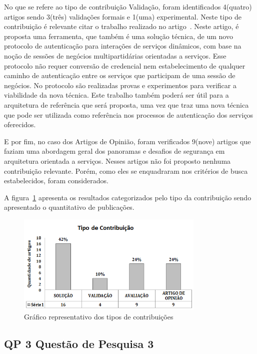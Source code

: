 No que se refere ao tipo de contribuição Validação, foram identificados 4(quatro) artigos  sendo 3(três) validações formais e 1(uma) experimental. Neste tipo de contribuição é relevante citar o trabalho realizado no artigo~\cite{ CrossRealmSOA2012}. Neste artigo, é proposta uma ferramenta, que também é uma solução técnica, de um novo protocolo de autenticação para interações de serviços dinâmicos, com base na noção de sessões de negócios multipartidárias orientadas a serviços. Esse protocolo não requer conversão de credencial nem estabelecimento de qualquer caminho de autenticação entre os serviços que participam de uma sessão de negócios. No protocolo são realizadas provas e experimentos para verificar a viabilidade da nova técnica. Este trabalho também poderá ser útil para a arquitetura de referência que será proposta, uma vez que traz uma nova técnica que pode ser utilizada como referência nos processos de autenticação dos serviços oferecidos.

E por fim, no caso dos Artigos de Opinião, foram verificados 9(nove) artigos que faziam uma abordagem geral dos panoramas e desafios de segurança em arquitetura orientada a serviços. Nesses artigos não foi proposto nenhuma contribuição relevante. Porém, como eles se enquadraram nos critérios de busca estabelecidos, foram considerados.

A figura~\ref{fig:Tipo_Contribuicao} apresenta os resultados categorizados pelo tipo da contribuição sendo apresentado o quantitativo de publicações.

\begin{figure}[!htb]
\centering
\includegraphics[width=0.8\textwidth]{tipo_contribuicao_3.png}
\caption{Gráfico representativo dos tipos de contribuições}
\label{fig:Tipo_Contribuicao}
\end{figure}


\subsection{QP 3 \- Questão de Pesquisa 3}

